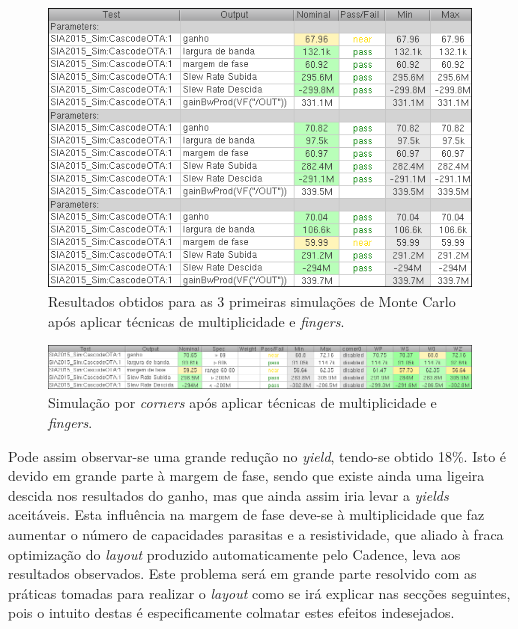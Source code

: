 \documentclass[11pt]{article}
\numberwithin{equation}{section}
\begin{document}
\begin{figure}[H]
	\centering
	\includegraphics[keepaspectratio=true, scale=0.65]{exps/MonteCarlo_3pt_Novo_Sim}
	\vspace{-0.5em}
	\caption{Resultados obtidos para as 3 primeiras simulações de Monte Carlo após aplicar técnicas de multiplicidade e \textit{fingers}.}
	\vspace{-0.8em}
\end{figure} 

\begin{figure}[H]
	\centering
	\includegraphics[keepaspectratio=true, scale=0.65]{exps/Corners_Novo_Sim}
	\vspace{-0.5em}
	\caption{Simulação por \textit{corners} após aplicar técnicas de multiplicidade e \textit{fingers}.}
	\vspace{-0.8em}
\end{figure}

Pode assim observar-se uma grande redução no \textit{yield}, tendo-se obtido 18\%. Isto é devido em grande parte à margem de fase, sendo que existe ainda uma ligeira descida nos resultados do ganho, mas que ainda assim iria levar a \textit{yields} aceitáveis. Esta influência na margem de fase deve-se à multiplicidade que faz aumentar o número de capacidades parasitas e a resistividade, que aliado à fraca optimização do \textit{layout} produzido automaticamente pelo Cadence, leva aos resultados observados. Este problema será em grande parte resolvido com as práticas tomadas para realizar o \textit{layout} como se irá explicar nas secções seguintes, pois o intuito destas é especificamente colmatar estes efeitos indesejados.
\end{document}

